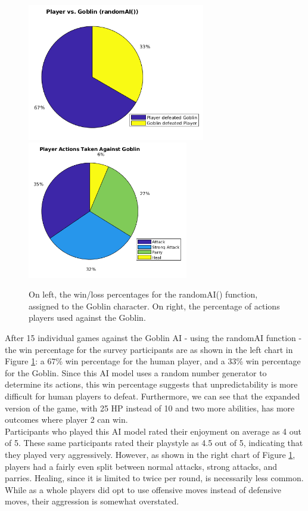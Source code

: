 \begin{figure}[H]
  \centering
  \includegraphics[width=7.75cm]{figures/goblinWins.png}
  \includegraphics[width=7cm]{figures/actionsGoblin.png}
  \caption{On left, the win/loss percentages for the randomAI() function, assigned to the Goblin character. On right, the percentage of actions players used against the Goblin.}
  \label{fig:pieGoblin}
\end{figure}
After 15 individual games against the Goblin AI - using the randomAI function - the win percentage for the survey participants are as shown in the left chart in Figure \ref{fig:pieGoblin}: a 67\% win percentage for the human player, and a 33\% win percentage for the Goblin. Since this AI model uses a random number generator to determine its actions, this win percentage suggests that unpredictability is more difficult for human players to defeat. Furthermore, we can see that the expanded version of the game, with 25 HP instead of 10 and two more abilities, has more outcomes where player 2 can win.\\

Participants who played this AI model rated their enjoyment on average as 4 out of 5. These same participants rated their playstyle as 4.5 out of 5, indicating that they played very aggressively. However, as shown in the right chart of Figure \ref{fig:pieGoblin}, players had a fairly even split between normal attacks, strong attacks, and parries. Healing, since it is limited to twice per round, is necessarily less common. While as a whole players did opt to use offensive moves instead of defensive moves, their aggression is somewhat overstated.

